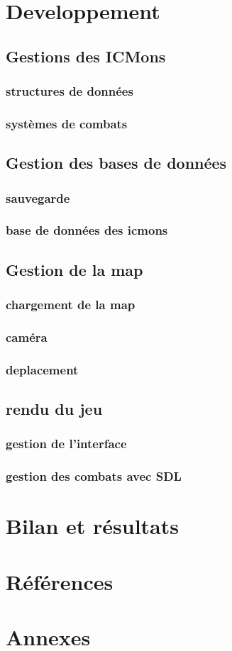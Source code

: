 \documentclass[12pt,a4paper, twoside]{article}
\begin{document}
\section{Developpement}
\subsection{Gestions des ICMons}
    \subsubsection{structures de données}
    \subsubsection{systèmes de combats}

\subsection{Gestion des bases de données}
    \subsubsection{sauvegarde}
    \subsubsection{base de données des icmons}

\subsection{Gestion de la map}
    \subsubsection{chargement de la map}
    \subsubsection{caméra}
    \subsubsection{deplacement}

\subsection{rendu du jeu}
    \subsubsection{gestion de l'interface}
    \subsubsection{gestion des combats avec SDL}


\section{Bilan et résultats}
\section{Références}
\section{Annexes}
\end{document}
